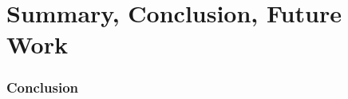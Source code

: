 
\section[Conclusion]{Summary, Conclusion, Future Work}
\label{sec:Concl}

\begin{frame}
\frametitle{Conclusion}
	
\end{frame}





